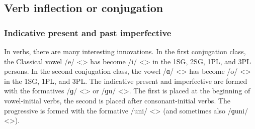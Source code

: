 \subsection{Verb inflection or conjugation}


\subsubsection{Indicative present and past imperfective}\label{sec:Hamshen:morphology:verb:indcprespst}




In verbs, there are many interesting innovations. In the first conjugation class, the Classical vowel /e/ <> has become /i/ <> in the 1SG, 2SG, 1PL, and 3PL persons. In the second conjugation class, the vowel /ɑ/ <> has become /o/ <> in the 1SG, 1PL, and 3PL. The indicative present and imperfective are formed with the formatives /ɡ/ <> or /ɡu/ <>. The first is placed at the beginning of vowel-initial verbs, the second is placed after consonant-initial verbs. The progressive is formed with the formative /uni/ <> (and sometimes also /ɡuni/ <>).




